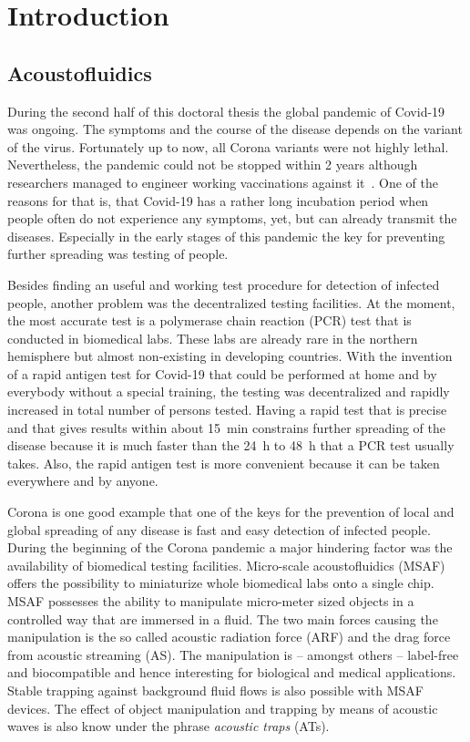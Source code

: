 \chapter{Introduction\label{ch:intro}}
\section{Acoustofluidics}

During the second half of this doctoral thesis the global pandemic of Covid-19 
was ongoing. The symptoms and the course of the disease depends on the variant 
of the virus. Fortunately up to now, all Corona variants were not highly 
lethal. Nevertheless, the pandemic could not be stopped within 2 years 
although researchers managed to engineer working vaccinations against 
it~\cite{Polack2020,Mahase2020,Voysey2021}. One of the reasons for that is, 
that Covid-19 has a rather long incubation period when people often do not 
experience any symptoms, yet, but can already transmit the diseases. 
Especially in the early stages of this pandemic the key for preventing further 
spreading was testing of people.

Besides finding an useful and working test procedure for detection of infected 
people, another problem was the decentralized testing facilities. At the 
moment, the most accurate test is a polymerase chain reaction (PCR) test that 
is conducted in biomedical labs. These labs are already rare in the northern 
hemisphere but almost non-existing in developing countries. With the invention 
of a rapid antigen test for Covid-19 that could be performed at home and by 
everybody without a special training, the testing was decentralized and rapidly 
increased in total number of persons tested. Having a rapid test that is 
precise~\cite{Albert2021} and that gives results within about \SI{15}{\minute} 
constrains further spreading of the disease because it is much faster than the 
\SI{24}{\hour} to \SI{48}{\hour} that a PCR test usually takes. Also, the 
rapid antigen test is more convenient because it can be taken everywhere and by 
anyone.

Corona is one good example that one of the keys for the prevention of local and 
global spreading of any disease is fast and easy detection of infected people. 
During the beginning of the Corona pandemic a major hindering factor was the 
availability of biomedical testing facilities. Micro-scale acoustofluidics 
(MSAF) offers the possibility to miniaturize whole biomedical labs onto a 
single chip. MSAF possesses the ability to manipulate micro-meter sized objects 
in a controlled way that are immersed in a fluid. The two main forces causing 
the manipulation is the so called acoustic radiation force (ARF) and the drag 
force from acoustic streaming (AS). The manipulation is -- amongst others -- 
label-free and biocompatible and hence interesting for biological and medical 
applications. Stable trapping against background fluid flows is also possible 
with MSAF devices. The effect of object manipulation and trapping by means of 
acoustic waves is also know under the phrase \emph{acoustic traps} (ATs).

